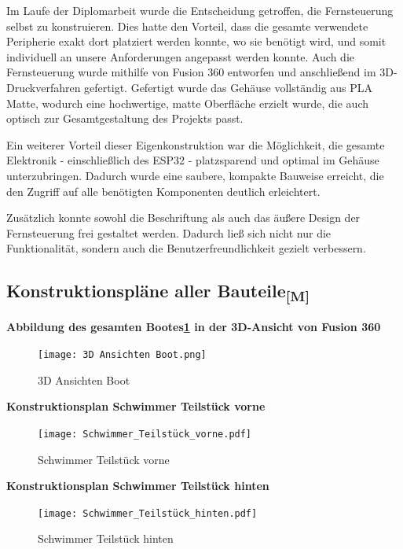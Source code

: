 \documentclass[a4paper,12pt]{article}
\begin{document}
Im Laufe der Diplomarbeit wurde die Entscheidung getroffen, die Fernsteuerung selbst zu konstruieren. Dies hatte den Vorteil, dass die gesamte verwendete Peripherie exakt dort platziert werden konnte, wo sie benötigt wird, und somit individuell an unsere Anforderungen angepasst werden konnte. Auch die Fernsteuerung wurde mithilfe von Fusion 360 entworfen und anschließend im 3D-Druckverfahren gefertigt. Gefertigt wurde das Gehäuse vollständig aus PLA Matte, wodurch eine hochwertige, matte Oberfläche erzielt wurde, die auch optisch zur Gesamtgestaltung des Projekts passt.


Ein weiterer Vorteil dieser Eigenkonstruktion war die Möglichkeit, die gesamte Elektronik - einschließlich des ESP32 - platzsparend und optimal im Gehäuse unterzubringen. Dadurch wurde eine saubere, kompakte Bauweise erreicht, die den Zugriff auf alle benötigten Komponenten deutlich erleichtert.

Zusätzlich konnte sowohl die Beschriftung als auch das äußere Design der Fernsteuerung frei gestaltet werden. Dadurch ließ sich nicht nur die Funktionalität, sondern auch die Benutzerfreundlichkeit gezielt verbessern.
\newpage



\subsection{\texorpdfstring{Konstruktionspläne aller Bauteile\textsubscript{[M]}}{Konstruktionspläne aller Bauteile [M]}}

\textbf{Abbildung des gesamten Bootes\ref{fig:3D Ansichten Boot} in der 3D-Ansicht von Fusion 360}

\begin{figure}[H]
    \centering
    \texttt{[image: 3D Ansichten Boot.png]}
    \caption{3D Ansichten Boot}
    \label{fig:3D Ansichten Boot}
\end{figure}


\textbf{Konstruktionsplan Schwimmer Teilstück vorne}

\begin{figure}[H]
    \centering
    \texttt{[image: Schwimmer\_Teilstück\_vorne.pdf]}
    \caption{Schwimmer Teilstück vorne}
    \label{fig:Schwimmer_vorne}
\end{figure}


\newpage

\textbf{Konstruktionsplan Schwimmer Teilstück hinten}

\begin{figure}[H]
    \centering
    \texttt{[image: Schwimmer\_Teilstück\_hinten.pdf]}
    \caption{Schwimmer Teilstück hinten}
    \label{fig:Schwimmer_hinten}
\end{figure}
 
\end{document}
